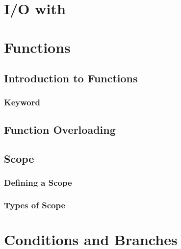 \documentclass{article}
\title{\thistitle}
\author{\me}
\date{\today}
\begin{document}
\maketitle
\tableofcontents
\pagebreak

\section{I/O with }

\subsection{}

\subsection{}

\section{Functions}

\subsection{Introduction to Functions}

\subsubsection{ Keyword}

\subsection{Function Overloading}

\subsection{Scope}

\subsubsection{Defining a Scope}

\subsubsection{Types of Scope}

\section{Conditions and Branches}
\end{document}
